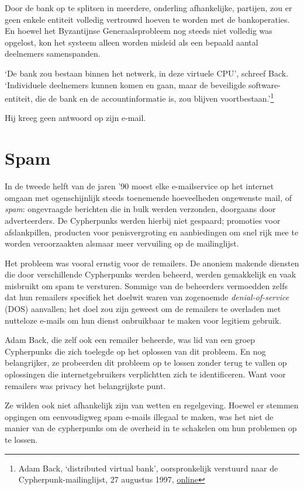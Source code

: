 \documentclass[
  a5paper,
  smalldemyvopaper,11pt,twoside,onecolumn,openright,extrafontsizes]{memoir}
\begin{document}
Door de bank op te splitsen in meerdere, onderling afhankelijke,
partijen, zou er geen enkele entiteit volledig vertrouwd hoeven te
worden met de bankoperaties. En hoewel het Byzantijnse Generaalsprobleem
nog steeds niet volledig was opgelost, kon het systeem alleen worden
misleid als een bepaald aantal deelnemers samenspanden.

`De bank zou bestaan binnen het netwerk, in deze virtuele CPU', schreef
Back. `Individuele deelnemers kunnen komen en gaan, maar de beveiligde
software-entiteit, die de bank en de accountinformatie is, zou blijven
voortbestaan.'\footnote{Adam Back, `distributed virtual bank',
  oorspronkelijk verstuurd naar de Cypherpunk-mailinglijst, 27 augustus
  1997,
  \href{https://cypherpunks.venona.com/date/1997/08/msg01289.html}{online}}

Hij kreeg geen antwoord op zijn e-mail.

\section{Spam}\label{spam}

In de tweede helft van de jaren '90 moest elke e-mailservice op het
internet omgaan met ogenschijnlijk steeds toenemende hoeveelheden
ongewenste mail, of \emph{spam}: ongevraagde berichten die in bulk
werden verzonden, doorgaans door adverteerders. De Cypherpunks werden
hierbij niet gespaard; promoties voor afslankpillen, producten voor
penisvergroting en aanbiedingen om snel rijk mee te worden veroorzaakten
alsmaar meer vervuiling op de mailinglijst.

Het probleem was vooral ernstig voor de remailers. De anoniem makende
diensten die door verschillende Cypherpunks werden beheerd, werden
gemakkelijk en vaak misbruikt om spam te versturen. Sommige van de
beheerders vermoedden zelfs dat hun remailers specifiek het doelwit
waren van zogenoemde \emph{denial-of-service} (DOS) aanvallen; het doel
zou zijn geweest om de remailers te overladen met nutteloze e-mails om
hun dienst onbruikbaar te maken voor legitiem gebruik.

Adam Back, die zelf ook een remailer beheerde, was lid van een groep
Cypherpunks die zich toelegde op het oplossen van dit probleem. En nog
belangrijker, ze probeerden dit probleem op te lossen zonder terug te
vallen op oplossingen die internetgebruikers verplichtten zich te
identificeren. Want voor remailers was privacy het belangrijkste punt.

Ze wilden ook niet afhankelijk zijn van wetten en regelgeving. Hoewel er
stemmen opgingen om eenvoudigweg spam e-mails illegaal te maken, was het
niet de manier van de cypherpunks om de overheid in te schakelen om hun
problemen op te lossen.
\end{document}
